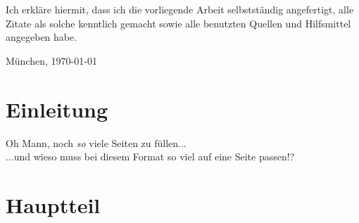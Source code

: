 \documentclass[11pt,a4paper,twoside]{article}
\begin{document}
\vfill %

\noindent Ich erkläre hiermit, dass ich die vorliegende Arbeit
selbstständig angefertigt, alle Zitate als solche kenntlich gemacht
sowie alle benutzten Quellen und Hilfsmittel angegeben habe.

\bigskip\noindent München, \today

\vspace{4ex}\noindent\makebox[7cm]{\dotfill}


\cleardoublepage
\pagestyle{fancy}
\setcounter{page}{1}

\tableofcontents


\cleardoublepage

\setcounter{page}{1}
\fancyhead[LE,RO]{\rightmark}
\fancyhead[LO,RE]{\leftmark}
\fancyfoot[LE,RO]{\thepage}

\section{Einleitung}

Oh Mann, noch \emph{so} viele Seiten zu füllen...\\
...und wieso muss bei diesem Format so viel auf eine Seite passen!?

\cleardoublepage %
\section{Hauptteil}
\end{document}

